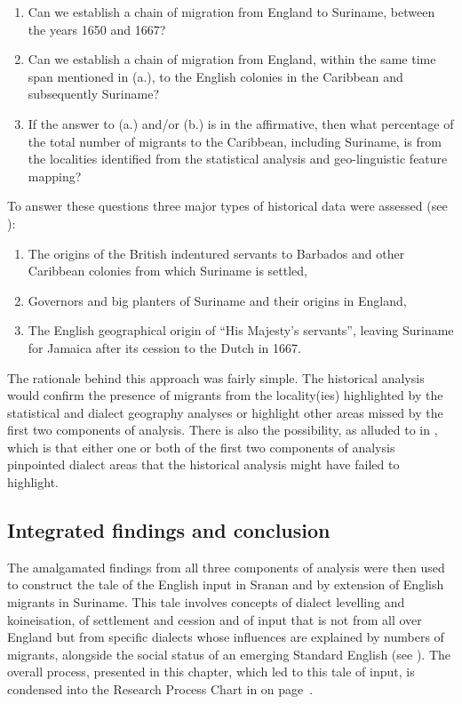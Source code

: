 {{{{{{{{{\begin{enumerate}
\item {Can we establish a chain of migration from England to Suriname, between the years 1650 and 1667?}
\item{Can we establish a chain of migration from England, within the same time span mentioned in (a.), to the English colonies in the Caribbean and subsequently Suriname?}
\item{If the answer to (a.) and/or (b.) is in the affirmative, then what percentage of the total number of migrants to the Caribbean, including Suriname, is from the localities identified from the statistical analysis and geo-linguistic feature mapping?}
\end{enumerate}

To answer these questions three major types of historical data were assessed (see ):

\begin{enumerate}
  \item {The origins of the British indentured servants to Barbados and other Caribbean colonies from which Suriname is settled,}
  \item {Governors and big planters of Suriname and their origins in England,}
  \item {The English geographical origin of ``His Majesty's servants'', leaving Suriname for Jamaica after its cession to the Dutch in 1667.}
\end{enumerate}

The rationale behind this approach was fairly simple. The historical analysis would confirm the presence of migrants from the locality(ies) highlighted by the statistical and dialect geography analyses or highlight other areas missed by the first two components of analysis. There is also the possibility, as alluded to in , which is that either one or both of the first two components of analysis pinpointed dialect areas that the historical analysis might have failed to highlight.

\subsection{Integrated findings and conclusion}
The amalgamated findings from all three components of analysis were then used to construct the tale of the English input in Sranan and by extension of English migrants in Suriname. This tale involves concepts of dialect levelling and koineisation, of settlement and cession and of input that is not from all over England but from specific dialects whose influences are explained by numbers of migrants, alongside the social status of an emerging Standard English (see ). The overall process, presented in this chapter, which led to this tale of input, is condensed into the Research Process Chart in  on page~\pageref{Figure 3.1}.

}}}}}}}}}
